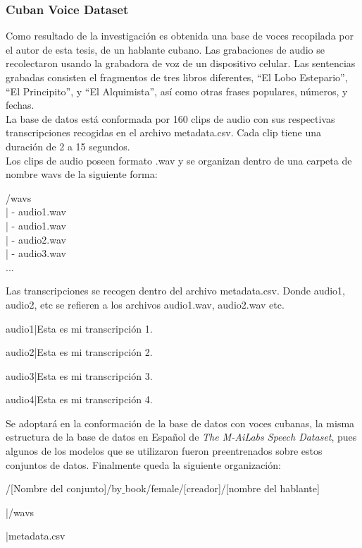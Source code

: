 \subsubsection{Cuban Voice Dataset}
Como resultado de la investigación es obtenida una base de voces recopilada por el autor de esta tesis, de un hablante cubano. Las grabaciones de audio se recolectaron usando la grabadora de voz de un dispositivo celular. Las sentencias grabadas consisten el fragmentos de tres libros diferentes, ``El Lobo Estepario'',  ``El Principito'', y  ``El Alquimista'', así como otras frases populares, números, y fechas.\\ 

La base de datos está conformada por 160 clips de audio con sus respectivas transcripciones recogidas en el archivo metadata.csv. Cada clip tiene una duración de 2 a 15 segundos.\\

Los clips de audio poseen formato .wav y se organizan dentro de una carpeta de nombre wavs de la siguiente forma:

\begin{center}
	/wavs\\
	| - audio1.wav\\
	| - audio1.wav\\
	| - audio2.wav\\
	| - audio3.wav\\
	...
\end{center}

Las transcripciones se recogen dentro del archivo metadata.csv. Donde audio1, audio2, etc se refieren a los archivos audio1.wav, audio2.wav etc.

\begin{center}
	audio1|Esta es mi transcripción 1.
	
	audio2|Esta es mi transcripción 2.
	
	audio3|Esta es mi transcripción 3.
	
	audio4|Esta es mi transcripción 4.
\end{center}

Se adoptará en la conformación de la base de datos con voces cubanas, la misma estructura de la base de datos en Español de \textit{The M-AiLabs Speech Dataset}, pues algunos de los modelos que se utilizaron fueron preentrenados sobre estos conjuntos de datos. Finalmente queda la siguiente organización:

\begin{flushleft}
	/[Nombre del conjunto]/by$\_$book/female/[creador]/[nombre del hablante]
	
	|/wavs
	
	|metadata.csv
\end{flushleft}

